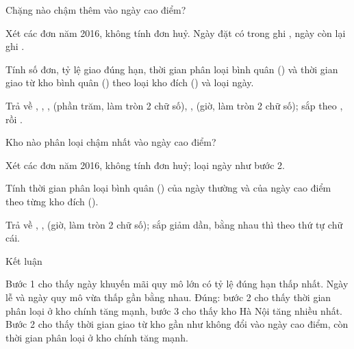 \documentclass[11pt,a4paper]{article}
\begin{document}
\begin{cauhoi}[ma=scm-c6-cao-diem-giao-tre, dulieu=scm, domain=marketing,
  hinhthuc=case, cap=medium, diem=30, tacgia={Agent gói 3}, trangthai=review, bokiemtra={public, hidden-1}, thutu=co, saiso=0.01]
\begin{buoc}[ma=b2, diem=8, hinhthuc=write, bang={orders, sorting_hubs, event_calendar}]{Chặng nào chậm thêm vào ngày cao điểm?}
  \begin{yeucau}
    \item Xét các đơn năm 2016, không tính đơn huỷ. Ngày đặt có trong  ghi , ngày còn lại ghi .
    \item Tính số đơn, tỷ lệ giao đúng hạn, thời gian phân loại bình quân () và thời gian giao từ kho bình quân () theo loại kho đích () và loại ngày.
    \item Trả về , , ,  (phần trăm, làm tròn 2 chữ số), ,  (giờ, làm tròn 2 chữ số); sắp theo , rồi .
  \end{yeucau}
\end{buoc}
\begin{buoc}[ma=b3, diem=8, hinhthuc=write, bang={orders, event_calendar}]{Kho nào phân loại chậm nhất vào ngày cao điểm?}
  \begin{yeucau}
    \item Xét các đơn năm 2016, không tính đơn huỷ; loại ngày như bước 2.
    \item Tính thời gian phân loại bình quân () của ngày thường và của ngày cao điểm theo từng kho đích ().
    \item Trả về , ,  (giờ, làm tròn 2 chữ số); sắp  giảm dần, bằng nhau thì  theo thứ tự chữ cái.
  \end{yeucau}
\end{buoc}
\begin{buoc}[ma=b4, diem=6, hinhthuc=ketluan, bang={orders, event_calendar}]{Kết luận}
  \begin{luachon}
      {Bước 1 cho thấy ngày khuyến mãi quy mô lớn có tỷ lệ đúng hạn thấp nhất. Ngày lễ và ngày quy mô vừa thấp gần bằng nhau.}
      {Đúng: bước 2 cho thấy thời gian phân loại ở kho chính tăng mạnh, bước 3 cho thấy kho Hà Nội tăng nhiều nhất.}
      {Bước 2 cho thấy thời gian giao từ kho gần như không đổi vào ngày cao điểm, còn thời gian phân loại ở kho chính tăng mạnh.}

\end{luachon}
\end{buoc}
\end{cauhoi}
\end{document}

